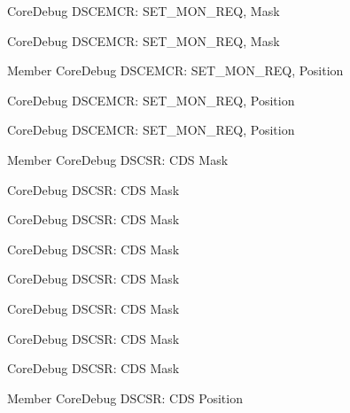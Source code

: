 \begin{DoxyRefList}
\label{deprecated__deprecated000629}%
%
Core\+Debug DSCEMCR\+: SET\+\_\+\+MON\+\_\+\+REQ, Mask 

\label{deprecated__deprecated000076}%
%
Core\+Debug DSCEMCR\+: SET\+\_\+\+MON\+\_\+\+REQ, Mask  
\item[Member \doxylink{group__CMSIS__SCB_ga77f02a6d773fa2c6daafbbdd7df2d9d2}{Core\+Debug\+\_\+\+DSCEMCR\+\_\+\+SET\+\_\+\+MON\+\_\+\+REQ\+\_\+\+Pos} ]\label{deprecated__deprecated000526}%
%
Core\+Debug DSCEMCR\+: SET\+\_\+\+MON\+\_\+\+REQ, Position 

\label{deprecated__deprecated000628}%
%
Core\+Debug DSCEMCR\+: SET\+\_\+\+MON\+\_\+\+REQ, Position 

\label{deprecated__deprecated000075}%
%
Core\+Debug DSCEMCR\+: SET\+\_\+\+MON\+\_\+\+REQ, Position  
\item[Member \doxylink{group__CMSIS__SCB_ga083417245e1aa40e84a2b12433a15a6b}{Core\+Debug\+\_\+\+DSCSR\+\_\+\+CDS\+\_\+\+Msk} ]\label{deprecated__deprecated000224}%
%
Core\+Debug DSCSR\+: CDS Mask 

\label{deprecated__deprecated000287}%
%
Core\+Debug DSCSR\+: CDS Mask 

\label{deprecated__deprecated000545}%
%
Core\+Debug DSCSR\+: CDS Mask 

\label{deprecated__deprecated000148}%
%
Core\+Debug DSCSR\+: CDS Mask 

\label{deprecated__deprecated000094}%
%
Core\+Debug DSCSR\+: CDS Mask 

\label{deprecated__deprecated000647}%
%
Core\+Debug DSCSR\+: CDS Mask 

\label{deprecated__deprecated000366}%
%
Core\+Debug DSCSR\+: CDS Mask 

\label{deprecated__deprecated000442}%
%
Core\+Debug DSCSR\+: CDS Mask  
\item[Member \doxylink{group__CMSIS__SCB_ga4be5d0f8af5d7d8ec04bde78ce18e10e}{Core\+Debug\+\_\+\+DSCSR\+\_\+\+CDS\+\_\+\+Pos} ]\label{deprecated__deprecated000223}%
%
Core\+Debug DSCSR\+: CDS Position 


\end{DoxyRefList}
